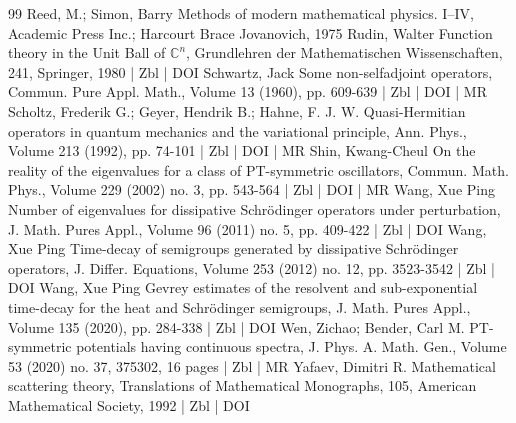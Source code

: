 \documentclass[10pt]{amsart}
\theoremstyle{definition}\newtheorem{defi}[theo]{Definition}\newtheorem{rema}[theo]{Remark}\newtheorem{exam}[theo]{Example}\newtheorem{exem}[theo]{Example}\newtheorem{nota}[theo]{Notation}
\begin{document}
\begin{thebibliography}{99}
Reed, M.; Simon, Barry Methods of modern mathematical physics. I–IV, Academic Press Inc.; Harcourt Brace Jovanovich, 1975
Rudin, Walter Function theory in the Unit Ball of $\mathbb{C}^n$, Grundlehren der Mathematischen Wissenschaften, 241, Springer, 1980 | Zbl | DOI
Schwartz, Jack Some non-selfadjoint operators, Commun. Pure Appl. Math., Volume 13 (1960), pp. 609-639 | Zbl | DOI | MR
Scholtz, Frederik G.; Geyer, Hendrik B.; Hahne, F. J. W. Quasi-Hermitian operators in quantum mechanics and the variational principle, Ann. Phys., Volume 213 (1992), pp. 74-101 | Zbl | DOI | MR
Shin, Kwang-Cheul On the reality of the eigenvalues for a class of PT-symmetric oscillators, Commun. Math. Phys., Volume 229 (2002) no. 3, pp. 543-564 | Zbl | DOI | MR
Wang, Xue Ping Number of eigenvalues for dissipative Schrödinger operators under perturbation, J. Math. Pures Appl., Volume 96 (2011) no. 5, pp. 409-422 | Zbl | DOI
Wang, Xue Ping Time-decay of semigroups generated by dissipative Schrödinger operators, J. Differ. Equations, Volume 253 (2012) no. 12, pp. 3523-3542 | Zbl | DOI
Wang, Xue Ping Gevrey estimates of the resolvent and sub-exponential time-decay for the heat and Schrödinger semigroups, J. Math. Pures Appl., Volume 135 (2020), pp. 284-338 | Zbl | DOI
Wen, Zichao; Bender, Carl M. PT-symmetric potentials having continuous spectra, J. Phys. A. Math. Gen., Volume 53 (2020) no. 37, 375302, 16 pages | Zbl | MR
Yafaev, Dimitri R. Mathematical scattering theory, Translations of Mathematical Monographs, 105, American Mathematical Society, 1992 | Zbl | DOI
\end{thebibliography}
\end{document}

